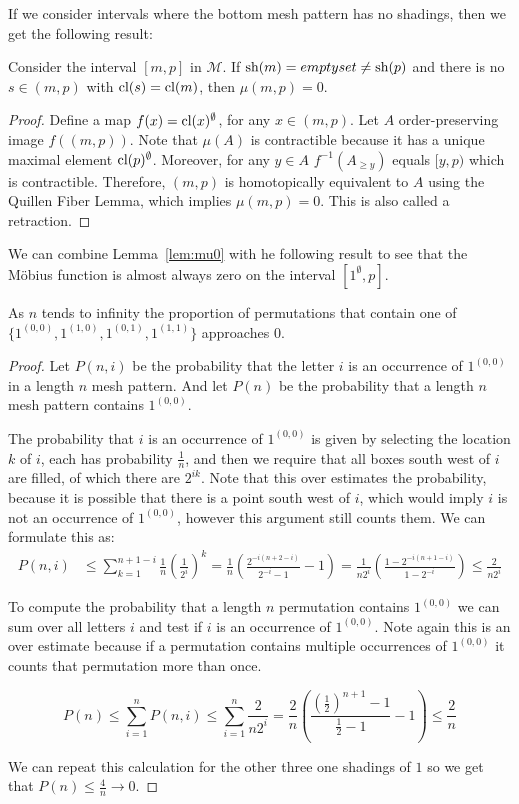 \documentclass[11pt,a4paper,oneside]{article}
\begin{document}
If we consider intervals where the bottom mesh pattern has no shadings, then we get the following result:
\begin{lem}\label{lem:mu0}
Consider the interval $[m,p]$ in $\mathcal{M}$. If $\operatorname{\textrm{sh}}(m)=emptyset\not=\operatorname{\textrm{sh}}(p)$ and there is no $s\in(m,p)$ with $\operatorname{\textrm{cl}}(s)=\operatorname{\textrm{cl}}(m)$, then $\mu(m,p)=0$.
\begin{proof}
Define a map $f(x)=\operatorname{\textrm{cl}}(x)^\emptyset$, for any $x\in(m,p)$. Let $A$ order-preserving image $f((m,p))$. Note that $\mu(A)$ is contractible because it has a unique maximal element $\operatorname{\textrm{cl}}(p)^\emptyset$. Moreover, for any $y\in A$ $f^{-1}(A_{\ge y})$ equals $[y,p)$ which is contractible. Therefore, $(m,p)$ is homotopically equivalent to $A$ using the Quillen Fiber Lemma, which implies $\mu(m,p)=0$. This is also called a retraction.
\end{proof}
\end{lem}
We can combine Lemma~\ref{lem:mu0} with he following result to see that the M\"obius function is almost always zero on the interval $[1^\emptyset,p]$.
\begin{lem}
As $n$ tends to infinity the proportion of permutations that contain one of $\{1^{(0,0)},1^{(1,0)},1^{(0,1)},1^{(1,1)}\}$ approaches $0$.
\begin{proof}
Let $P(n,i)$ be the probability that the letter $i$ is an occurrence of $1^{(0,0)}$ in a length $n$ mesh pattern. And let $P(n)$ be the probability that a length $n$ mesh pattern contains $1^{(0,0)}$.

The probability that $i$ is an occurrence of $1^{(0,0)}$ is given by selecting the location $k$ of $i$, each has probability $\frac{1}{n}$, and then we require that all boxes south west of $i$ are filled, of which there are $2^{ik}$. Note that this over estimates the probability, because it is possible that there is a point south west of $i$, which would imply $i$ is not an occurrence of $1^{(0,0)}$, however this argument still counts them. We can formulate this as:
\begin{align*}
P(n,i)&\le\sum_{k=1}^{n+1-i}\frac{1}{n}\left(\frac{1}{2^i}\right)^k=\frac{1}{n}\left(\frac{2^{-i(n+2-i)}}{2^{-i}-1}-1\right)=\frac{1}{n2^i}\left(\frac{1-2^{-i(n+1-i)}}{1-2^{-i}}\right)\le\frac{2}{n2^i}
\end{align*}

To compute the probability that a length $n$ permutation contains $1^{(0,0)}$ we can sum over all letters $i$ and test if $i$ is an occurrence of $1^{(0,0)}$. Note again this is an over estimate because if a permutation contains multiple occurrences of $1^{(0,0)}$ it counts that permutation more than once.

$$P(n)\le\sum_{i=1}^{n}P(n,i)\le\sum_{i=1}^{n}\frac{2}{n2^i}=\frac{2}{n}\left(\frac{\left(\frac{1}{2}\right)^{n+1}-1}{\frac{1}{2}-1}-1\right)\le\frac{2}{n} $$

We can repeat this calculation for the other three one shadings of $1$ so we get that $P(n)\le \frac{4}{n}\rightarrow 0$.
\end{proof}
\end{lem}
\end{document}
